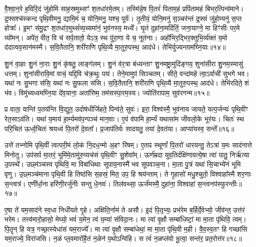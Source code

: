 वै॒श्वा॒न॒रे ह॒विरि॒दं जु॑होमि साह॒स्रमुथ्सꣳ॑ श॒तधा॑रमे॒तम्। 
तस्मि॑न्ने॒ष पि॒तरं॑ पिताम॒हं प्रपि॑तामहं बिभर॒त्पिन्व॑माने। 
द्र॒फ्सश्च॑स्कन्द पृथि॒वीमनु॒ द्यामि॒मं च॒ योनि॒मनु॒ यश्च॒ पूर्वः॑। 
तृ॒तीयं॒ योनि॒मनु॑ स॒ञ्चर॑न्तं द्र॒फ्सं जु॑हो॒म्यनु॑ स॒प्त होत्राः᳚। 
इ॒मꣳ स॑मु॒द्रꣳ श॒तधा॑र॒मुथ्सं॑व्य॒च्यमा॑नं॒ भुव॑नस्य॒ मध्ये᳚। 
घृ॒तं दुहा॑ना॒मदि॑तिं॒ जना॒याग्ने॒ मा हिꣳ॑सीः पर॒मे व्यो॑मन्। 
अपे॑त॒ वीत॒ वि च॑ सर्प॒तातो॒ येऽत्र॒ स्थ पु॑रा॒णा ये च॒ नूत॑नाः। 
अहो॑भिर॒द्भिर॒क्तुभि॒र्व्य॑क्तं य॒मो द॑दात्वव॒सान॑मस्मै। 
स॒वि॒तैतानि॒ शरी॑राणि पृथि॒व्यै मा॒तुरु॒पस्थ॒ आद॑धे। 
तेभि॑र्युज्यन्तामघ्नि॒याः॥१४॥\ip

शु॒नं वा॒हाः  शु॒नं ना॒राः  शु॒नं कृ॑षतु॒ लाङ्ग॑लम्। 
शु॒नं व॑र॒त्रा ब॑ध्यन्ताꣳ शु॒नमष्ट्रा॒मुदि॑ङ्गय॒ शुना॑सीरा शु॒नम॒स्मासु॑ धत्तम्। 
शुना॑सीरावि॒मां वाचं॒ यद्दि॒वि च॑क्र॒थुः पयः॑। 
तेने॒मामुप॑ सिञ्चतम्। 
सीते॒ वन्दा॑महे त्वा॒ऽर्वाची॑ सुभगे भव। 
यथा॑ नः सु॒भगा स॑सि॒ यथा॑ नः सु॒फला स॑सि। 
स॒वि॒तैतानि॒ शरी॑राणि पृथि॒व्यै मा॒तुरु॒पस्थ॒ आद॑धे। 
तेभि॑रदिते॒ शं भ॑व। 
विमु॑च्यध्वमघ्नि॒या दे॑व॒याना॒ अता॑रिष्म॒ तम॑सस्पा॒रम॒स्य। 
ज्योति॑रापाम॒ सुव॑रगन्म॥१५॥\ip

प्र वाता॒ वान्ति॑ प॒तय॑न्ति वि॒द्युत॒ उदोष॑धीर्जिहते॒ पिन्व॑ते॒ सुवः॑। 
इरा॒ विश्व॑स्मै॒ भुव॑नाय जायते॒ यत्प॒र्जन्यः॑ पृथि॒वीꣳ रेत॒साऽव॑ति। 
यथा॑ य॒माय॑ हा॒र्म्यमव॑प॒न्पञ्च॑ मान॒वाः। 
ए॒वं व॑पामि हा॒र्म्यं यथासा॑म जीवलो॒के भूर॑यः। 
चितः॑ स्थ परि॒चित॑ ऊर्ध्व॒चितः॑  श्रयध्वं पि॒तरो॑ दे॒वता᳚। 
प्र॒जाप॑तिर्वः सादयतु॒ तया॑ दे॒वत॑या। 
आप्या॑यस्व॒ सन्ते᳚॥१६॥%
\anuvakamend[अ॒घ्नि॒या अ॑गन्म स॒प्त च॑]

उत्ते॑ तभ्नोमि पृथि॒वीं त्वत्परी॒मं लो॒कं नि॒दध॒न्मो अ॒हꣳ रि॑षम्। 
ए॒ताꣴ स्थूणां᳚ पि॒तरो॑ धारयन्तु॒ तेऽत्रा॑ य॒मः साद॑नात्ते मिनोतु। 
उप॑सर्प मा॒तरं॒ भूमि॑मे॒तामु॑रु॒व्यच॑सं पृथि॒वीꣳ सु॒शेवा᳚म्। 
ऊर्ण॑म्रदा युव॒तिर्दक्षि॑णावत्ये॒षा त्वा॑ पातु॒ निर्\mbox{}ऋ॑त्या उ॒पस्थे᳚। 
उछ्म॑ञ्चस्व पृथिवि॒ मा विबा॑धिथाः सूपाय॒नास्मै॑ भव सूपवञ्च॒ना। 
मा॒ता पु॒त्रं यथा॑ सि॒चाभ्ये॑नं भूमि वृणु। 
उ॒छ्मञ्च॑माना पृथि॒वी हि तिष्ठ॑सि स॒हस्रं॒ मित॒ उप॒ हि श्रय॑न्ताम्। 
ते गृ॒हासो॑ मधु॒श्चुतो॒ विश्वाहा᳚स्मै शर॒णाः स॒न्त्वत्र॑। 
एणी᳚र्धा॒ना हरि॑णी॒रर्जु॑नीः सन्तु धे॒नवः॑। 
तिल॑वथ्सा॒ ऊर्ज॑मस्मै॒ दुहा॑ना॒ विश्वाहा॑ स॒न्त्वनप॑स्फुरन्तीः॥१७॥\ip

ए॒षा ते॑ यम॒साद॑ने स्व॒धा निधी॑यते गृ॒हे। 
अक्षि॑ति॒र्नाम॑ ते असौ। 
इ॒दं पि॒तृभ्यः॒ प्रभ॑रेम ब॒र्\mbox{}हिर्दे॒वेभ्यो॒ जीव॑न्त॒ उत्त॑रं भरेम। 
तत्त्व॑मारो॒हासो॒ मेघ्यो॒ भवं॑ य॒मेन॒ त्वं य॒म्या॑ संविदा॒नः। 
मा त्वा॑ वृ॒क्षौ सम्बा॑धिष्टां॒ मा मा॒ता पृ॑थिवि॒ त्वम्। 
पि॒तॄन् हि यत्र॒ गच्छा॒स्येधा॑सं यम॒राज्ये᳚। 
मा त्वा॑ वृ॒क्षौ सम्बा॑धेथां॒ मा मा॒ता पृ॑थि॒वी म॒ही। 
वै॒व॒स्व॒तꣳ हि गच्छा॑सि यम॒राज्ये॒ विरा॑जसि। 
न॒ळं प्ल॒वमारो॑है॒तं न॒ळेन॑ प॒थोऽन्वि॑हि। 
स त्वं॑ न॒ळप्ल॑वो भू॒त्वा॒ सन्त॑र॒ प्रत॒रोत्त॑र॥१८॥\ip

